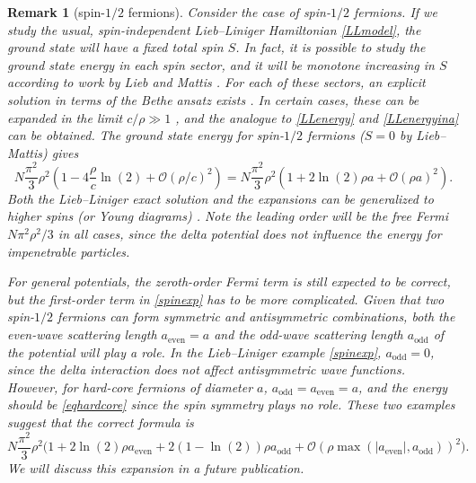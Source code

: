 \documentclass[a4paper,11pt]{article}
\newtheorem{remark}[theorem]{Remark}
\numberwithin{equation}{section}
\begin{document}
	\begin{remark}[spin-$1/2$ fermions]
		Consider the case of spin-$1/2$ fermions. If we study the usual, spin-independent Lieb--Liniger Hamiltonian \eqref{LLmodel}, the ground state will have a fixed total spin $S$. In fact, it is possible to study the ground state energy in each spin sector, and it will be monotone increasing in $S$ according to work by Lieb and Mattis \cite{lieb1962theory}. For each of these sectors, an explicit solution in terms of the Bethe ansatz exists \cite{yang1967some,gaudin1967systeme}. In certain cases, these can be expanded in the limit $c/\rho\gg1$ \cite{guan2011analytical}, and the analogue to \eqref{LLenergy} and \eqref{LLenergyina} can be obtained. The ground state energy for spin-$1/2$ fermions ($S=0$ by Lieb--Mattis) gives \cite{girardeau2006ground,guan2011analytical}
		\begin{equation}
			\label{spinexp}
			N\frac{\pi^2}{3}\rho^2\left(1-4\frac{\rho}{c}\ln(2)+\mathcal{O}(\rho/c)^2\right)=N\frac{\pi^2}{3}\rho^2\left(1+2\ln(2)\rho a+\mathcal{O}(\rho a)^2\right).
		\end{equation}
		Both the Lieb--Liniger exact solution and the expansions can be generalized to higher spins (or Young diagrams) \cite{sutherland1968further,guan2012one}. Note the leading order will be the free Fermi $N\pi^2\rho^2/3$ in all cases, since the delta potential does not influence the energy for impenetrable particles.
		
		For general potentials, the zeroth-order Fermi term is still expected to be correct, but the first-order term in \eqref{spinexp} has to be more complicated. Given that two spin-$1/2$ fermions can form symmetric and antisymmetric combinations, both the even-wave scattering length $a_{\text{even}}=a$ and the odd-wave scattering length $a_{\text{odd}}$ of the potential will play a role. In the Lieb--Liniger example \eqref{spinexp}, $a_{\text{odd}}=0$, since the delta interaction does not affect antisymmetric wave functions. However, for hard-core fermions of diameter $a$, $a_{\text{odd}}=a_{\text{even}}=a$, and the energy should be \eqref{eqhardcore} since the spin symmetry plays no role. These two examples suggest that the correct formula is
		\begin{equation}
			N\frac{\pi^2}{3}\rho^2\big(1+2\ln(2)\rho a_{\text{even}}+2(1-\ln(2))\rho a_{\text{odd}}+\mathcal{O}(\rho \max(|a_{\text{even}}|,a_{\text{odd}}))^2\big).  
		\end{equation}
		We will discuss this expansion in a future publication.
	\end{remark}
	
\end{document}

